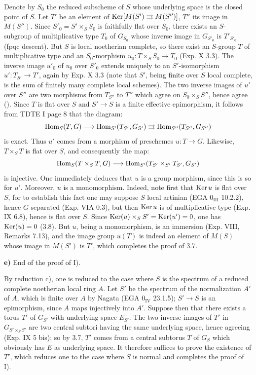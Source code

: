 Denote by $S_0$ the reduced subscheme of $S$ whose underlying space is the closed point of $S$. Let $T'$ be an element of $\operatorname{Ker}[M(S')\rightrightarrows M(S'')]$, $T''$ its image in $M(S'')$. Since $S'_0=S'\times_S S_0$ is faithfully flat over $S_0$, there exists an $S$-subgroup of multiplicative type $T_0$ of $G_{S_0}$ whose inverse image in $G_{S'_0}$ is $T'_{S'_0}$ (fpqc descent). But $S$ is local noetherian complete, so there exist an $S$-group $T$ of multiplicative type and an $S_0$-morphism $u_0:T\times_S S_0\to T_0$ (Exp. X 3.3). The inverse image $u'_0$ of $u_0$ over $S'_0$ extends uniquely to an $S'$-isomorphism $u':T_{S'}\to T'$, again by Exp. X 3.3 (note that $S'$, being finite over $S$ local complete, is the sum of finitely many complete local schemes). The two inverse images of $u'$ over $S''$ are two morphisms from $T_{S''}$ to $T''$ which agree on $S_0\times_S S''$, hence agree (\loccit). Since $T$ is flat over $S$ and $S'\to S$ is a finite effective epimorphism, it follows from TDTE I page 8 that the diagram:
\[
\operatorname{Hom}_S(T,G)\longrightarrow\operatorname{Hom}_{S'}(T_{S'},G_{S'})\rightrightarrows\operatorname{Hom}_{S''}(T_{S''},G_{S''})
\]
is exact. Thus $u'$ comes from a morphism of preschemes $u:T\to G$. Likewise, $T\times_S T$ is flat over $S$, and consequently the map:
\[
\operatorname{Hom}_S(T\times_S T,G)\longrightarrow\operatorname{Hom}_{S'}(T_{S'}\times_{S'}T_{S'},G_{S'})
\]
is injective. One immediately deduces that $u$ is a group morphism, since this is so for $u'$. Moreover, $u$ is a monomorphism. Indeed, note first that $\operatorname{Ker} u$ is flat over $S$, for to establish this fact one may suppose $S$ local artinian (EGA $0_{\mathrm{III}}$ 10.2.2), hence $G$ separated (Exp. VIA 0.3), but then $\operatorname{Ker} u$ is of multiplicative type (Exp. IX 6.8), hence is flat over $S$. Since $\operatorname{Ker}(u)\times_S S'=\operatorname{Ker}(u')=0$, one has $\operatorname{Ker}(u)=0$ (3.8). But $u$, being a monomorphism, is an immersion (Exp. VIII, Remarks 7.13), and the image group $u(T)$ is indeed an element of $M(S)$ whose image in $M(S')$ is $T'$, which completes the proof of 3.7.

\noindent\textbf{e)} End of the proof of I).

By reduction c), one is reduced to the case where $S$ is the spectrum of a reduced complete noetherian local ring $A$. Let $S'$ be the spectrum of the normalization $A'$ of $A$, which is finite over $A$ by Nagata (EGA $0_{\mathrm{IV}}$ 23.1.5); $S'\to S$ is an epimorphism, since $A$ maps injectively into $A'$. Suppose then that there exists a torus $T'$ of $G_{S'}$ with underlying space $E_{S'}$. The two inverse images of $T'$ in $G_{S'\times_S S'}$ are two central subtori having the same underlying space, hence agreeing (Exp. IX 5 bis); so by 3.7, $T'$ comes from a central subtorus $T$ of $G_S$ which obviously has $E$ as underlying space. It therefore suffices to prove the existence of $T'$, which reduces one to the case where $S$ is normal and completes the proof of I).

